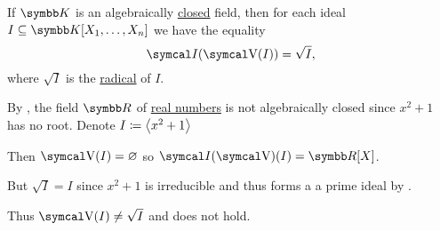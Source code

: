 \begin{theorem}\label{thm:geometric_nullstellensatz}
  If \( \BK \) is an algebraically \hyperref[def:algebraically_closed_field]{closed} field, then for each ideal \( I \subseteq \BK[X_1, \ldots, X_n] \) we have the equality
  \begin{equation*}
    \Cal{I}(\CV(I)) = \sqrt I,
  \end{equation*}
  where \( \sqrt I \) is the \hyperref[def:radical_ideal]{radical} of \( I \).
\end{theorem}

\begin{example}\label{ex:geometric_nullstellensatz_does_not_hold_for_reals}
  By , the field \( \BR \) of \hyperref[def:real_numbers]{real numbers} is not algebraically closed since \( x^2 + 1 \) has no root. Denote \( I \coloneqq \Braket{x^2 + 1} \)

  Then \( \CV(I) = \varnothing \) so \( \Cal{I}(\CV)(I) = \BR[X] \).

  But \( \sqrt{I} = I \) since \( x^2 + 1 \) is irreducible and thus forms a a prime ideal by .

  Thus \( \CV(I) \neq \sqrt{I} \) and  does not hold.
\end{example}


